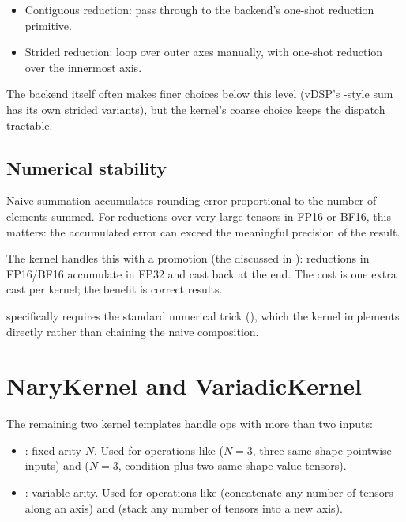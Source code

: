 \begin{itemize}
  \item Contiguous reduction: pass through to the backend's
    one-shot reduction primitive.
  \item Strided reduction: loop over outer axes manually, with
    one-shot reduction over the innermost axis.
\end{itemize}

The backend itself often makes finer choices below this level
(vDSP's -style sum has its own strided variants),
but the kernel's coarse choice keeps the dispatch tractable.

\subsection{Numerical stability}
\label{ssec:kernel_abstraction:reduce_stability}

Naive summation accumulates rounding error proportional to the
number of elements summed. For reductions over very large tensors
in FP16 or BF16, this matters: the accumulated error can exceed
the meaningful precision of the result.

The kernel handles this with a  promotion (the
 discussed in ): reductions
in FP16/BF16 accumulate in FP32 and cast back at the end. The cost
is one extra cast per kernel; the benefit is correct results.

 specifically requires the standard numerical
trick (),
which the kernel implements directly rather than chaining the
naive composition.

\section{NaryKernel and VariadicKernel}
\label{sec:kernel_abstraction:variadic}

The remaining two kernel templates handle ops with more than two
inputs:

\begin{itemize}
  \item {}: fixed arity \(N\). Used for
    operations like  (\(N = 3\), three same-shape
    pointwise inputs) and  (\(N = 3\), condition plus
    two same-shape value tensors).
  \item {}: variable arity. Used for
    operations like  (concatenate any number of tensors
    along an axis) and  (stack any number of tensors
    into a new axis).
\end{itemize}

